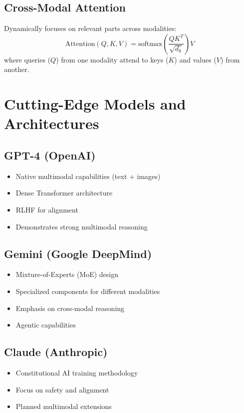 \documentclass[openany]{book}
\begin{document}
\subsection{Cross-Modal Attention}
Dynamically focuses on relevant parts across modalities:
\begin{equation}
\text{Attention}(Q,K,V) = \text{softmax}\left(\frac{QK^T}{\sqrt{d_k}}\right)V
\end{equation}
where queries ($Q$) from one modality attend to keys ($K$) and values ($V$) 
from another.

\section{Cutting-Edge Models and Architectures}

\subsection{GPT-4 (OpenAI)}
\begin{itemize}
    \item Native multimodal capabilities (text + images)
    \item Dense Transformer architecture
    \item RLHF for alignment
    \item Demonstrates strong multimodal reasoning
\end{itemize}

\subsection{Gemini (Google DeepMind)}
\begin{itemize}
    \item Mixture-of-Experts (MoE) design
    \item Specialized components for different modalities
    \item Emphasis on cross-modal reasoning
    \item Agentic capabilities
\end{itemize}

\subsection{Claude (Anthropic)}
\begin{itemize}
    \item Constitutional AI training methodology
    \item Focus on safety and alignment
    \item Planned multimodal extensions
\end{itemize}
\end{document}
